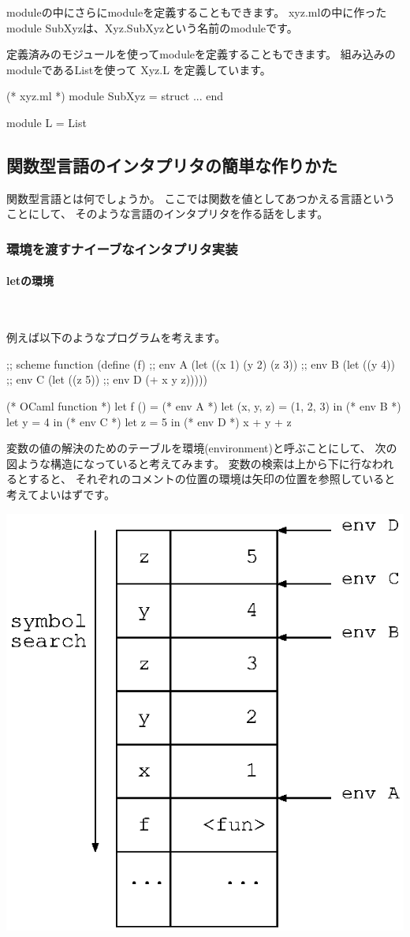 \documentclass[mingoth,a4paper]{jsarticle}
\begin{document}
moduleの中にさらにmoduleを定義することもできます。
xyz.mlの中に作ったmodule SubXyzは、Xyz.SubXyzという名前のmoduleです。

定義済みのモジュールを使ってmoduleを定義することもできます。
組み込みのmoduleであるListを使って Xyz.L を定義しています。

\begin{commandline}
(* xyz.ml *)
module SubXyz =
  struct
  ...
  end

module L = List
\end{commandline}


\subsection{関数型言語のインタプリタの簡単な作りかた}

関数型言語とは何でしょうか。
ここでは関数を値としてあつかえる言語ということにして、
そのような言語のインタプリタを作る話をします。

\subsubsection{環境を渡すナイーブなインタプリタ実装}
\label{sec:envmach}

\paragraph{letの環境} \ 

例えば以下のようなプログラムを考えます。

\begin{commandline}
;; scheme function
(define (f)
  ;; env A
  (let ((x 1) (y 2) (z 3))
    ;; env B
    (let ((y 4))
      ;; env C
      (let ((z 5))
	;; env D
	(+ x y z)))))
\end{commandline}

\begin{commandline}
(* OCaml function *)
let f () =
  (* env A *)
  let (x, y, z) = (1, 2, 3) in
    (* env B *)
  let y = 4 in
    (* env C *)
  let z = 5 in
    (* env D *)
    x + y + z
\end{commandline}

変数の値の解決のためのテーブルを環境(environment)と呼ぶことにして、
次の図ような構造になっていると考えてみます。
変数の検索は上から下に行なわれるとすると、
それぞれのコメントの位置の環境は矢印の位置を参照していると考えてよいはずです。

 \includegraphics[height=0.3\hsize]{image201002/caml-env00.eps}\label{fig:env00}
\end{document}
